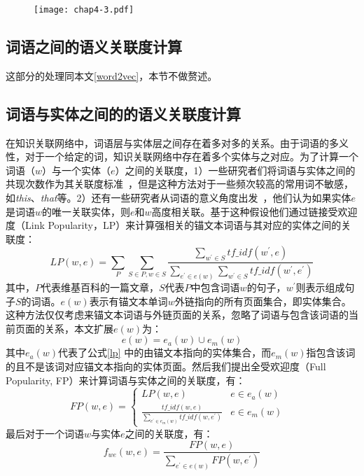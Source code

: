 \begin{figure}[!ht]
    \centerline{\texttt{[image: chap4-3.pdf]}}
    \label{chap4-3}
\end{figure}

\subsection{词语之间的语义关联度计算}
\label{dbpedia_word2vec}
这部分的处理同本文\ref{word2vec}，本节不做赘述。

\subsection{词语与实体之间的的语义关联度计算}
在知识关联网络中，词语层与实体层之间存在着多对多的关系。由于词语的多义性，对于一个给定的词，知识关联网络中存在着多个实体与之对应。为了计算一个词语（$w$）与一个实体（$e$）之间的关联度，1）一些研究者们将词语与实体之间的共现次数作为其关联度标准~\cite{aaai/Pirro12}，但是这种方法对于一些频次较高的常用词不敏感，如\emph{this}、\emph{that}等。2）还有一些研究者从词语的意义角度出发~\cite{aaai/GongXH18}，他们认为如果实体$e$是词语$w$的唯一关联实体，则$e$和$w$高度相关联。基于这种假设他们通过链接受欢迎度（Link Popularity，LP）来计算强相关的锚文本词语与其对应的实体之间的关联度：
\begin{equation}
    \label{lp}
    LP(w, e) = \sum_{P}^{ }\sum_{S \in P, w \in S}^{ } \frac{\sum_{w^{'} \in S}^{ }tf\_idf(w^{'},e)}
    {\sum_{e^{'} \in e(w)}^{ }\sum_{w^{'} \in S}^{ }tf\_idf(w^{'}, e^{'})}
\end{equation}
\noindent 其中，$P$代表维基百科的一篇文章，$S$代表$P$中包含词语$w$的句子，$w^{'}$则表示组成句子$S$的词语。$e(w)$表示有锚文本单词$w$外链指向的所有页面集合，即实体集合。这种方法仅仅考虑来锚文本词语与外链页面的关系，忽略了词语与包含该词语的当前页面的关系，本文扩展$e(w)$为：
\begin{equation}
    \label{entities-set}
    e(w) = e_{a}(w) \cup e_{m}(w)
\end{equation}
\noindent 其中$e_{a}(w)$代表了公式\ref{lp} 中的由锚文本指向的实体集合，而$e_{m}(w)$指包含该词的且不是该词对应锚文本指向的实体页面。然后我们提出全受欢迎度（Full Popularity, FP）来计算词语与实体之间的关联度，有：
\begin{equation}
    \label{fp}
    FP(w,e) = \left\{\begin{matrix}
        LP(w,e) & e \in e_{a}(w) & \\
        \frac{tf\_idf(w,e)}{\sum_{e^{'} \in e_m(w)}^{ }tf\_idf(w,e^{'})} & e \in e_{m}(w) & 
        \end{matrix}\right.
\end{equation}
\noindent 最后对于一个词语$w$与实体$e$之间的关联度，有：
\begin{equation}
    \label{f_we}
    f_{we}(w, e) = \frac{FP(w, e)}{\sum_{e^{'} \in e(w)}^{ }FP(w, e^{'})}
\end{equation}


